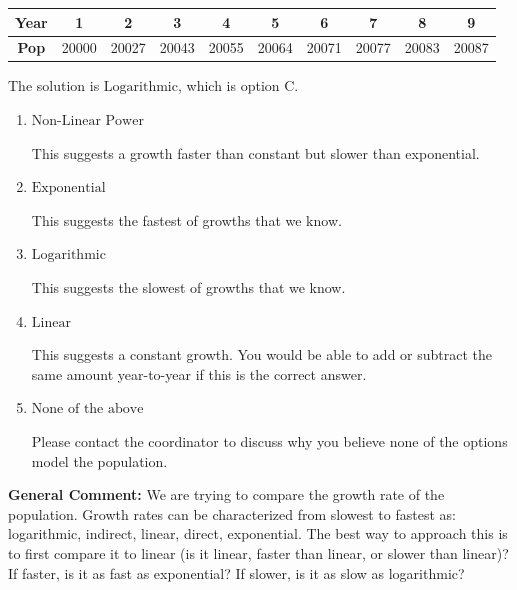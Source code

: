 \documentclass{extbook}[14pt]
\begin{document}
\begin{enumerate}
{\begin{tabular}{c|c|c|c|c|c|c|c|c|c}
\textbf{Year} &1 &2 &3 &4 &5 &6 &7 &8 &9\tabularnewline \hline
\textbf{Pop} &20000 &20027 &20043 &20055 &20064 &20071 &20077 &20083 &20087\end{tabular}The solution is \( \text{Logarithmic} \), which is option C.\begin{enumerate}[label=\Alph*.]
\item \( \text{Non-Linear Power} \)

This suggests a growth faster than constant but slower than exponential.
\item \( \text{Exponential} \)

This suggests the fastest of growths that we know.
\item \( \text{Logarithmic} \)

This suggests the slowest of growths that we know.
\item \( \text{Linear} \)

This suggests a constant growth. You would be able to add or subtract the same amount year-to-year if this is the correct answer.
\item \( \text{None of the above} \)

Please contact the coordinator to discuss why you believe none of the options model the population.
\end{enumerate}

\textbf{General Comment:} We are trying to compare the growth rate of the population. Growth rates can be characterized from slowest to fastest as: logarithmic, indirect, linear, direct, exponential. The best way to approach this is to first compare it to linear (is it linear, faster than linear, or slower than linear)? If faster, is it as fast as exponential? If slower, is it as slow as logarithmic?
}
\end{enumerate}
\end{document}
